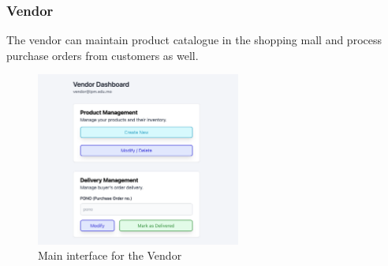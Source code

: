 \documentclass{article}
\begin{document}
\newpage
\subsubsection{Vendor}
The vendor can maintain product catalogue in the shopping mall and process purchase orders from customers as well. 
\begin{figure}[!htp]
    \centering
    \includegraphics[width=0.6\textwidth]{vendor outlook.png}
    \caption{\label{fig:vendor outlook}Main interface for the Vendor}
\end{figure}
\end{document}
